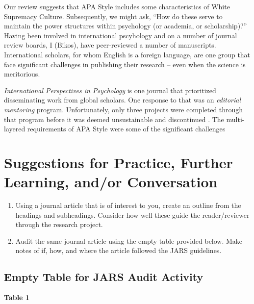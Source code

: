 \documentclass[
  11pt,
]{book}
\providecommand{\tightlist}{%
  \setlength{\itemsep}{0pt}\setlength{\parskip}{0pt}}
\begin{document}
Our review suggests that APA Style includes some characteristics of White Supremacy Culture. Subsequently, we might ask, ``How do these serve to maintain the power structures within psychology (or academia, or scholarship)?'' Having been involved in international pscyhology and on a number of journal review boards, I (Bikos), have peer-reviewed a number of manuscripts. International scholars, for whom English is a foreign language, are one group that face significant challenges in publishing their research \citep{gibbons_inaugural_2012} -- even when the science is meritorious.

\emph{International Perspectives in Psychology} is one journal that prioritized disseminating work from global scholars. One response to that was an \emph{editorial mentoring} program. Unfortunately, only three projects were completed through that program before it was deemed unsustainable and discontinued \citep{gibbons_ippquo_2016}. The multi-layered requirements of APA Style were some of the significant challenges

\hypertarget{suggestions-for-practice-further-learning-andor-conversation-1}{%
\section{Suggestions for Practice, Further Learning, and/or Conversation}\label{suggestions-for-practice-further-learning-andor-conversation-1}}

\begin{enumerate}
\def\labelenumi{\arabic{enumi}.}
\tightlist
\item
  Using a journal article that is of interest to you, create an outline from the headings and subheadings. Consider how well these guide the reader/reviewer through the research project.
\item
  Audit the same journal article using the empty table provided below. Make notes of if, how, and where the article followed the JARS guidelines.
\end{enumerate}

\hypertarget{empty-table-for-jars-audit-activity}{%
\subsection{Empty Table for JARS Audit Activity}\label{empty-table-for-jars-audit-activity}}

\textbf{Table 1}
\end{document}

